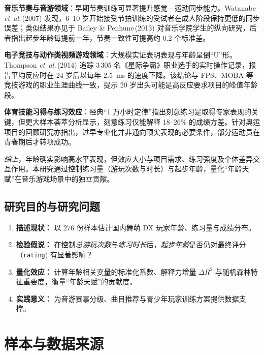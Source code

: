 \documentclass[12pt]{article}
\begin{document}
\textbf{音乐节奏与音游领域}：早期节奏训练可显著提升感觉—运动同步能力。Watanabe \emph{et~al.}\,(2007) 发现，6–10 岁开始接受节拍训练的受试者在成人阶段保持更低的同步误差；类似结果亦见于 Bailey \& Penhune\,(2013) 对音乐学院学生的纵向研究，后者指出起步年龄每提前一年，节奏一致性可提高约 0.2 个标准差\cite{Watanabe2007,Bailey2013}。

\textbf{电子竞技与动作类视频游戏领域}：大规模实证表明表现与年龄呈倒“U”形。Thompson \emph{et~al.}\,(2014) 追踪 3\,305 名《星际争霸》职业选手的实时操作记录，报告平均反应时在 24 岁后以每年 2.5~ms 的速度下降\cite{Thompson2014}。该结论与 FPS、MOBA 等竞技游戏的职业生涯曲线一致，提示 20 岁出头可能是高反应要求项目的峰值年龄段。

\textbf{体育技能习得与练习效应}：经典“1 万小时定律”指出刻意练习是取得专家表现的关键\cite{Ericsson1993}，但更大样本荟萃分析显示，刻意练习仅能解释 18–26\% 的成绩方差\cite{Macnamara2014}。针对奥运项目的回顾研究亦指出，过早专业化并非通向顶尖表现的必要条件，部分运动员在青春期后才转项成功\cite{Gullich2017,Vaeyens2009}。

\noindent\emph{综上}，年龄确实影响高水平表现，但效应大小与项目需求、练习强度及个体差异交互作用。本研究通过控制练习量（游玩次数与时长）与起步年龄，量化“年龄天赋”在音乐游戏场景中的独立贡献。

\subsection{研究目的与研究问题}

\begin{enumerate}
	\item \textbf{描述现状：} 以 276 份样本估计国内舞萌 DX 玩家年龄、练习量与成绩分布。
	\item \textbf{检验假说：} 在控制\emph{总游玩次数}与\emph{练习时长}后，\emph{起步年龄}是否仍对最终评分（\texttt{rating}) 有显著影响？
	\item \textbf{量化效应：} 计算年龄相关变量的标准化系数、解释力增量 $\Delta R^2$ 与随机森林特征重要度，衡量“年龄天赋”的贡献度。
	\item \textbf{实践意义：} 为音游赛事分级、曲目推荐与青少年玩家训练方案提供数据支撑。
\end{enumerate}

\section{样本与数据来源}
\end{document}

